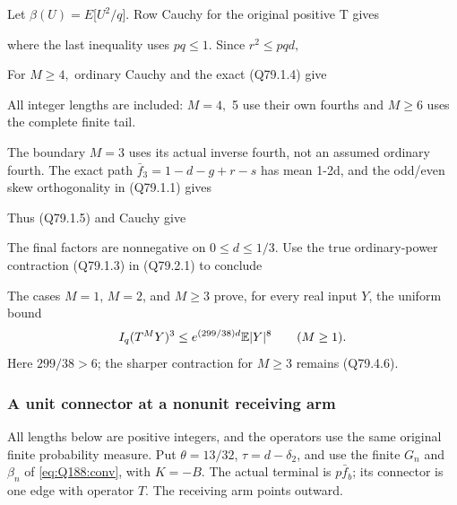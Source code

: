Let \(\beta(U)=E\)[\(U^2/q\)]. Row Cauchy for the original positive T gives


where the last inequality uses \(pq\le 1.\) Since \(r^2\le pqd,\allowbreak \)


For \(M\ge 4,\allowbreak \) ordinary Cauchy and the exact (Q79.1.4) give


All integer lengths are included: \(M=4,\allowbreak \) 5 use their own fourths and \(M\ge 6\) uses the complete finite tail.

The boundary \(M=3\) uses its actual inverse fourth, not an assumed
ordinary fourth. The exact path \(\bar f_3=1-d-g+r-s\) has mean 1-2d,
and the odd/even skew orthogonality in (Q79.1.1) gives


Thus (Q79.1.5) and Cauchy give


The final factors are nonnegative on \(0\le d\le 1/3.\) Use the true
ordinary-power contraction (Q79.1.3) in (Q79.2.1) to conclude


The cases \(M=1\), \(M=2\), and \(M\ge3\) prove, for every real
input \(Y\), the uniform bound
\begin{equation}\label{eq:ordinary-unanchored:uniform}
 I_q(T^MY)^3\le e^{(299/38)d}\mathbb E|Y|^8\qquad(M\ge1).
\end{equation}
Here \(299/38>6\); the sharper contraction for \(M\ge3\) remains
(Q79.4.6).

\subsubsection{A unit connector at a nonunit receiving arm}
\label{proof:Q5-C074}\label{sec:ordinary-unit-inner}

All lengths below are positive integers, and the operators use the
same original finite probability measure. Put
\(\theta=13/32\), \(\tau=d-\delta_2\), and use the finite
\(G_n\) and \(\beta_n\) of \eqref{eq:Q188:conv}, with \(K=-B\).
The actual terminal is \(p\bar f_b\); its connector is one edge
with operator \(T\). The receiving arm points outward.

